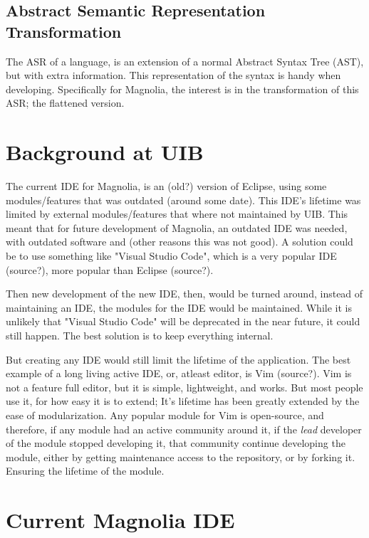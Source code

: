 \subsection{Abstract Semantic Representation Transformation}

The ASR of a language, is an extension of a normal Abstract Syntax Tree (AST),
but with extra information. This representation of the syntax is handy when
developing. Specifically for Magnolia, the interest is in the transformation of
this ASR; the flattened version.

\section{Background at UIB}

The current IDE for Magnolia, is an (old?) version of Eclipse, using some
modules/features that was outdated (around some date). This IDE's lifetime was
limited by external modules/features that where not maintained by UIB. This
meant that for future development of Magnolia, an outdated IDE was needed, with
outdated software and (other reasons this was not good). A solution could be to
use something like "Visual Studio Code", which is a very popular IDE (source?),
more popular than Eclipse (source?).

Then new development of the new IDE, then, would be turned around, instead of
maintaining an IDE, the modules for the IDE would be maintained. While it is
unlikely that "Visual Studio Code" will be deprecated in the near future, it
could still happen. The best solution is to keep everything internal.

But creating any IDE would still limit the lifetime of the application. The best
example of a long living active IDE, or, atleast editor, is Vim (source?). Vim
is not a feature full editor, but it is simple, lightweight, and works. But most
people use it, for how easy it is to extend; It's lifetime has been greatly
extended by the ease of modularization. Any popular module for Vim is
open-source, and therefore, if any module had an active community around it, if
the \textit{lead} developer of the module stopped developing it, that community
continue developing the module, either by getting maintenance access to the
repository, or by forking it. Ensuring the lifetime of the module.

\section{Current Magnolia IDE}
